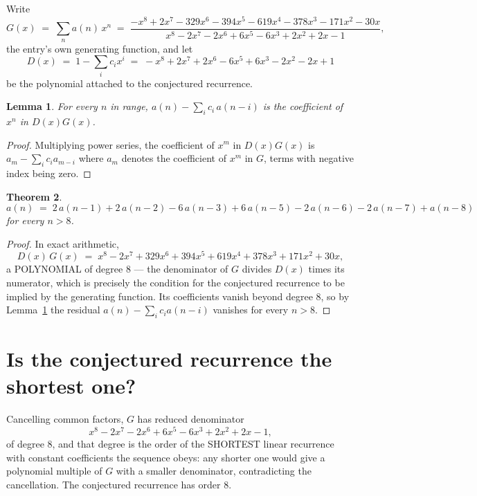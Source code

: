 \documentclass[11pt,a4paper]{article}
\theoremstyle{plain}
\newtheorem{theorem}{Theorem}
\newtheorem{lemma}[theorem]{Lemma}
\theoremstyle{definition}
\begin{document}
Write
\[
G(x)\;=\;\sum_{n}a(n)\,x^{n}\;=\;\frac{- x^{8} + 2 x^{7} - 329 x^{6} - 394 x^{5} - 619 x^{4} - 378 x^{3} - 171 x^{2} - 30 x}{x^{8} - 2 x^{7} - 2 x^{6} + 6 x^{5} - 6 x^{3} + 2 x^{2} + 2 x - 1},
\]
the entry's own generating function, and let
\[
D(x)\;=\;1-\sum_i c_i x^{i}\;=\;- x^{8} + 2 x^{7} + 2 x^{6} - 6 x^{5} + 6 x^{3} - 2 x^{2} - 2 x + 1
\]
be the polynomial attached to the conjectured recurrence.

\begin{lemma}\label{lem:key}
For every $n$ in range, $a(n)-\sum_i c_i\,a(n-i)$ is the coefficient of $x^{n}$ in
$D(x)G(x)$.
\end{lemma}

\begin{proof}
Multiplying power series, the coefficient of $x^{m}$ in $D(x)G(x)$ is
$a_m-\sum_i c_i a_{m-i}$ where $a_m$ denotes the coefficient of $x^{m}$ in $G$, terms with
negative index being zero.
\end{proof}

\begin{theorem}
\[
a(n)\;=\;2\,a(n-1) + 2\,a(n-2) - 6\,a(n-3) + 6\,a(n-5) - 2\,a(n-6) - 2\,a(n-7) + a(n-8)
\]
for every $n>8$.
\end{theorem}

\begin{proof}
In exact arithmetic,
\[
D(x)\,G(x)\;=\;x^{8} - 2 x^{7} + 329 x^{6} + 394 x^{5} + 619 x^{4} + 378 x^{3} + 171 x^{2} + 30 x,
\]
a POLYNOMIAL of degree $8$ --- the denominator of $G$ divides $D(x)$ times its numerator,
which is precisely the condition for the conjectured recurrence to be implied by the
generating function. Its coefficients vanish beyond degree $8$, so by
Lemma~\ref{lem:key} the residual $a(n)-\sum_ic_ia(n-i)$ vanishes for every
$n>8$.
\end{proof}

\section{Is the conjectured recurrence the shortest one?}

Cancelling common factors, $G$ has reduced denominator
\[
x^{8} - 2 x^{7} - 2 x^{6} + 6 x^{5} - 6 x^{3} + 2 x^{2} + 2 x - 1,
\]
of degree $8$, and that degree is the order of the SHORTEST linear recurrence with
constant coefficients the sequence obeys: any shorter one would give a polynomial multiple of
$G$ with a smaller denominator, contradicting the cancellation. The conjectured recurrence has
order $8$.
\end{document}
